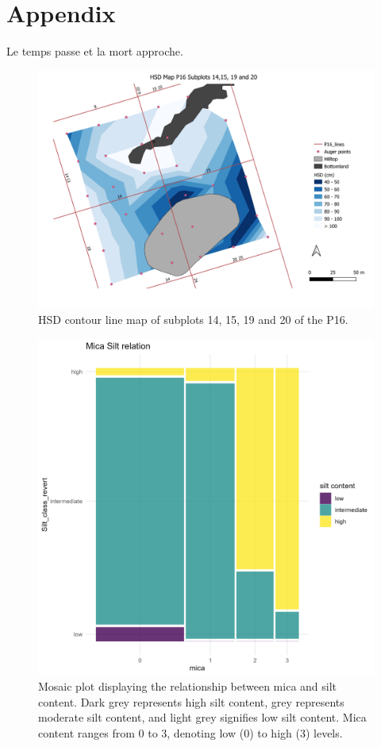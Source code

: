 \documentclass[fleqn,11pt]{latex/stylish_article} %
\begin{document}
\hypertarget{appendix}{%
\section{Appendix}\label{appendix}}

Le temps passe et la mort approche.

\break



\scriptsize

\begin{figure}

{\centering \includegraphics[width=0.6\linewidth]{images/HSD_MapwithBFandPL} 

}

\caption{HSD contour line map of subplots 14, 15, 19 and 20 of the P16.}\label{fig:HSDMapwithBFandPL}
\end{figure}

\normalsize



\scriptsize

\begin{figure}

{\centering \includegraphics[width=0.6\linewidth]{images/augerPlot_micaCor} 

}

\caption{Mosaic plot displaying the relationship between mica and silt content. Dark grey represents high silt content, grey represents moderate silt content, and light grey signifies low silt content. Mica content ranges from 0 to 3, denoting low (0) to high (3) levels.}\label{fig:augerPlotmicaCor}
\end{figure}
\end{document}

